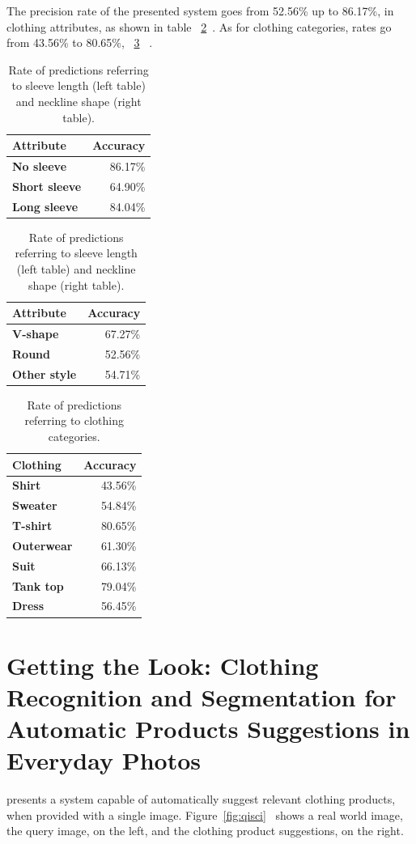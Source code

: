 \documentclass[titlepage,12pt,a4paper,times]{book}
\begin{document}
The precision rate of the presented system goes from 52.56\% up to 86.17\%,
in clothing attributes, as shown in table ~\ref{tab:ropsn}~\citep{2}. As for
clothing categories, rates go from 43.56\% to 80.65\%, ~\ref{tab:ropcc}
~\citep{2}.

\begin{table}
\centering
\begin{tabular}{|l|r|}
\hline
\textbf{Attribute} & \textbf{Accuracy}\\
\hline
\hline
\textbf{No sleeve} & 86.17\% \\
\hline
\textbf{Short sleeve} & 64.90\% \\
\hline
\textbf{Long sleeve} & 84.04\% \\
\hline
\end{tabular}
\quad
\begin{tabular}{|l|r|}
\hline
\textbf{Attribute} & \textbf{Accuracy}\\
\hline
\hline
\textbf{V-shape} & 67.27\% \\
\hline
\textbf{Round} & 52.56\% \\
\hline
\textbf{Other style} & 54.71\% \\
\hline
\end{tabular}
\caption{Rate of predictions referring to sleeve length (left table) and
neckline shape (right table).}
\label{tab:ropsn}
\end{table}
\FloatBarrier

\begin{table}
\centering
\begin{tabular}{|l|r|}
\hline
\textbf{Clothing} & \textbf{Accuracy}\\
\hline
\hline
\textbf{Shirt} & 43.56\% \\
\hline
\textbf{Sweater} & 54.84\% \\
\hline
\textbf{T-shirt} & 80.65\% \\
\hline
\textbf{Outerwear} & 61.30\% \\
\hline
\textbf{Suit} & 66.13\% \\
\hline
\textbf{Tank top} & 79.04\% \\
\hline
\textbf{Dress} & 56.45\% \\
\hline
\end{tabular}
\caption{Rate of predictions referring to clothing categories.}
\label{tab:ropcc}
\end{table}
\FloatBarrier

\section{Getting the Look: Clothing Recognition and Segmentation for Automatic
Products Suggestions in Everyday Photos}
\label{chap2:sec:art3}
\citep{3} presents a system capable of automatically suggest relevant clothing
products, when provided with a single image. Figure~\ref{fig:qisci}~\citep{3}
shows a real world image, the query image, on the left, and the clothing product
suggestions, on the right.
\end{document}
